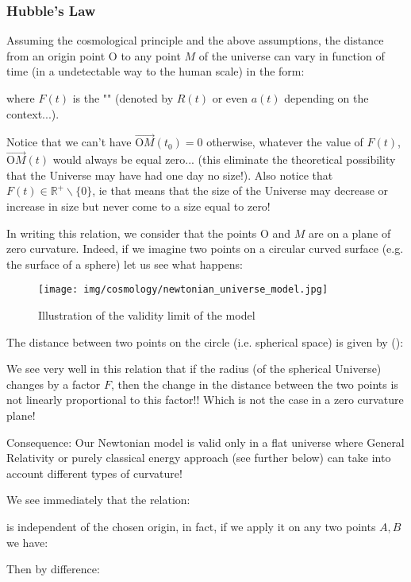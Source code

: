 	\pagebreak
	\subsubsection{Hubble's Law}
	Assuming the cosmological principle and the above assumptions, the distance from an origin point O to any point $M$ of the universe can vary in function of time (in a undetectable way to the human scale) in the form:
	
	where $F(t)$ is the "" (denoted by $R(t)$ or even $a(t)$ depending on the context...). 
	
	Notice that we can't have $\overrightarrow{\text{O}M}(t_0)=0$ otherwise, whatever the value of $F(t)$, $\overrightarrow{\text{O}M}(t)$ would always be equal zero... (this eliminate the theoretical possibility that the Universe may have had one day no size!). Also notice that $F(t)\in \mathbb{R}^+\backslash\{0\}$, ie that means that the size of the Universe may decrease or increase in size but never come to a size equal to zero!
	
	In writing this relation, we consider that the points O and $M$ are on a plane of zero curvature. Indeed, if we imagine two points on a circular curved surface (e.g. the surface of a sphere) let us see what happens:
	\begin{figure}[H]
		\centering
		\texttt{[image: img/cosmology/newtonian\_universe\_model.jpg]}	
		\caption{Illustration of the validity limit of the model}
	\end{figure}
	The distance between two points on the circle (i.e. spherical space) is given by ():
	
	We see very well in this relation that if the radius (of the spherical Universe) changes by a factor $F$, then the change in the distance between the two points is not linearly proportional to this factor!! Which is not the case in a zero curvature plane!
	
	Consequence: Our Newtonian model is valid only in a flat universe where General Relativity or purely classical energy approach (see further below) can take into account different types of curvature!
	
	We see immediately that the relation:
	
	is independent of the chosen origin, in fact, if we apply it on any two points $A, B$ we have:
	
	Then by difference:
	
